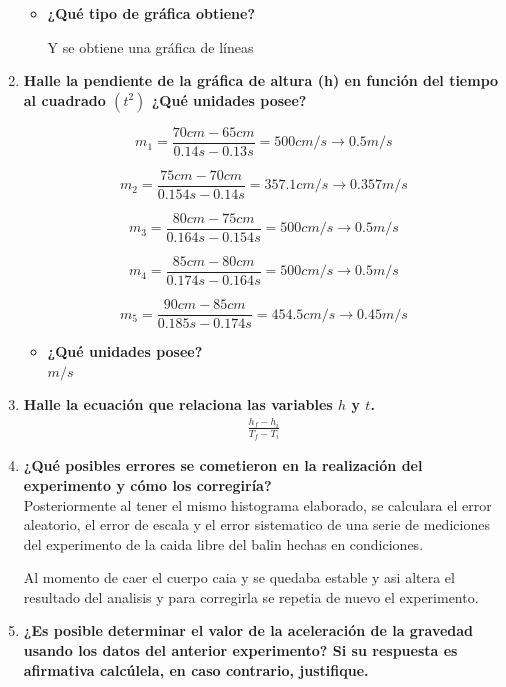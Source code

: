 \documentclass[11pt,twocolumn]{article}
\begin{document}
\begin{enumerate}
\begin{itemize}
    \item \textbf{¿Qué tipo de gráfica obtiene?}

    Y se obtiene una gráfica de líneas

\end{itemize}

 \item \textbf{Halle la pendiente de la gráfica de altura (h) en función del tiempo al cuadrado $\left(t^{2}\right)$ ¿Qué unidades posee?}

 $$m_{1}=\frac{70cm-65cm}{0.14s-0.13s}=500cm/s\rightarrow 0.5m/s$$

 $$m_{2}=\frac{75cm-70cm}{0.154s-0.14s}=357.1cm/s\rightarrow 0.357m/s$$

 $$m_{3}=\frac{80cm-75cm}{0.164s-0.154s}=500cm/s\rightarrow 0.5m/s$$

 $$m_{4}=\frac{85cm-80cm}{0.174s-0.164s}=500cm/s\rightarrow 0.5m/s$$

 $$m_{5}=\frac{90cm-85cm}{0.185s-0.174s}=454.5cm/s\rightarrow 0.45m/s$$
\begin{itemize}
    \item \textbf{¿Qué unidades posee?}\\

    $m/s$
    
\end{itemize}
 

 \item \textbf{Halle la ecuación que relaciona las variables $h$ y $t$.}
    \begin{gather*} 
\frac{h_{f}-h_{i}}{T_{f}-T_{i}}
\end{gather*}
    

\item \textbf{¿Qué posibles errores se cometieron en la realización del experimento y cómo los corregiría?}\\

Posteriormente al tener el mismo histograma elaborado, se calculara el error aleatorio, el error de escala y el error sistematico de una serie de mediciones del experimento de la caida libre del balin hechas en condiciones.

Al momento de caer el cuerpo caia y se quedaba estable y asi altera el resultado del analisis y para corregirla se repetia de nuevo el experimento.



\item \textbf{¿Es posible determinar el valor de la aceleración de la gravedad usando los datos del anterior experimento? Si su respuesta es afirmativa calcúlela, en caso contrario, justifique.}\\


\end{enumerate}
\end{document}
